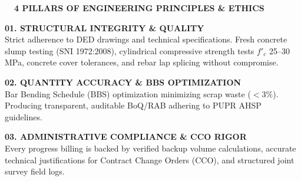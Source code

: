 \documentclass[10pt,a4paper,landscape]{article}
\begin{document}
\begin{minipage}[t]{0.40\linewidth}
  \vspace{0pt}
  \begin{tcolorbox}[sharp corners, boxrule=0.8pt, colframe=pborder, colback=pbglight, left=3.5mm, right=3.5mm, top=2.5mm, bottom=2.5mm, height=154mm]
    \colorbox{pnavy}{\fontsize{7pt}{8pt}\selectfont\bfseries\color{white}\ \ 4 PILLARS OF ENGINEERING PRINCIPLES \& ETHICS\ \ }\\[2mm]

    \begin{tcolorbox}[sharp corners, boxrule=0.5pt, colframe=pborder, colback=white, left=2.5mm, right=2.5mm, top=2mm, bottom=2mm]
      {\fontsize{7.2pt}{8.5pt}\selectfont\bfseries\color{pred}01. STRUCTURAL INTEGRITY \& QUALITY}\\[0.8mm]
      {\fontsize{6.5pt}{8.2pt}\selectfont\color{psteel}Strict adherence to DED drawings and technical specifications. Fresh concrete slump testing (SNI 1972:2008), cylindrical compressive strength tests $f'_c$ 25--30 MPa, concrete cover tolerances, and rebar lap splicing without compromise.}
    \end{tcolorbox}
    \vspace{1.5mm}

    \begin{tcolorbox}[sharp corners, boxrule=0.5pt, colframe=pborder, colback=white, left=2.5mm, right=2.5mm, top=2mm, bottom=2mm]
      {\fontsize{7.2pt}{8.5pt}\selectfont\bfseries\color{pred}02. QUANTITY ACCURACY \& BBS OPTIMIZATION}\\[0.8mm]
      {\fontsize{6.5pt}{8.2pt}\selectfont\color{psteel}Bar Bending Schedule (BBS) optimization minimizing scrap waste ($< 3\%$). Producing transparent, auditable BoQ/RAB adhering to PUPR AHSP guidelines.}
    \end{tcolorbox}
    \vspace{1.5mm}

    \begin{tcolorbox}[sharp corners, boxrule=0.5pt, colframe=pborder, colback=white, left=2.5mm, right=2.5mm, top=2mm, bottom=2mm]
      {\fontsize{7.2pt}{8.5pt}\selectfont\bfseries\color{pred}03. ADMINISTRATIVE COMPLIANCE \& CCO RIGOR}\\[0.8mm]
      {\fontsize{6.5pt}{8.2pt}\selectfont\color{psteel}Every progress billing is backed by verified backup volume calculations, accurate technical justifications for Contract Change Orders (CCO), and structured joint survey field logs.}
    \end{tcolorbox}
    \vspace{1.5mm}


\end{tcolorbox}
\end{minipage}
\end{document}
